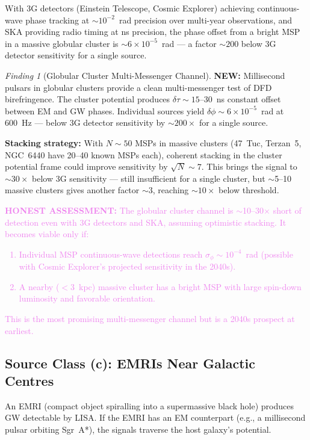 \documentclass[11pt]{article}
\theoremstyle{definition}
\theoremstyle{remark}
\newtheorem{finding}[theorem]{Finding}
\newcommand{\ee}[1]{\times10^{#1}}
\newcommand{\honest}[1]{\textcolor{violet}{\textbf{HONEST ASSESSMENT:} #1}}
\newcommand{\newresult}[1]{\textcolor{green!50!black}{\textbf{NEW:} #1}}
\begin{document}
With 3G detectors (Einstein Telescope, Cosmic Explorer) achieving
continuous-wave phase tracking at $\sim 10^{-2}$~rad precision over
multi-year observations, and SKA providing radio timing at ns
precision, the phase offset from a bright MSP in a massive globular
cluster is $\sim 6\ee{-5}$~rad --- a factor $\sim 200$ below 3G
detector sensitivity for a single source.

\begin{finding}[Globular Cluster Multi-Messenger Channel]
\label{find:cluster}
\newresult{Millisecond pulsars in globular clusters provide a clean
multi-messenger test of DFD birefringence. The cluster potential
produces $\delta\tau \sim 15$--30~ns constant offset between EM and
GW phases. Individual sources yield $\delta\phi \sim 6\ee{-5}$~rad
at 600~Hz --- below 3G detector sensitivity by $\sim 200\times$ for
a single source.}

\textbf{Stacking strategy:} With $N \sim 50$ MSPs in massive
clusters (47~Tuc, Terzan~5, NGC~6440 have 20--40 known MSPs each),
coherent stacking in the cluster potential frame could improve
sensitivity by $\sqrt{N} \sim 7$. This brings the signal to
$\sim 30\times$ below 3G sensitivity --- still insufficient for
a single cluster, but $\sim$5--10 massive clusters gives another
factor $\sim 3$, reaching $\sim 10\times$ below threshold.

\honest{The globular cluster channel is $\sim$10--30$\times$ short
of detection even with 3G detectors and SKA, assuming optimistic
stacking. It becomes viable only if:
\begin{enumerate}[nosep]
\item Individual MSP continuous-wave detections reach
  $\sigma_\phi \sim 10^{-4}$~rad (possible with Cosmic Explorer's
  projected sensitivity in the 2040s).
\item A nearby ($< 3$~kpc) massive cluster has a bright MSP with
  large spin-down luminosity and favorable orientation.
\end{enumerate}
This is the most promising multi-messenger channel but is a 2040s
prospect at earliest.}
\end{finding}

\subsection{Source Class (c): EMRIs Near Galactic Centres}

An EMRI (compact object spiralling into a supermassive black hole)
produces GW detectable by LISA. If the EMRI has an EM counterpart
(e.g., a millisecond pulsar orbiting Sgr~A*), the signals traverse
the host galaxy's potential.
\end{document}
